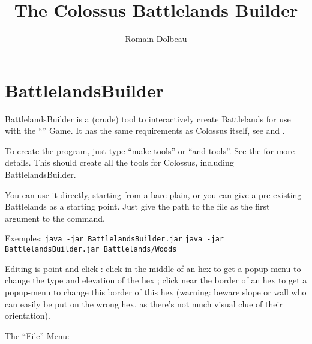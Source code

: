 \documentclass{article}
\begin{document}

\title{The Colossus Battlelands Builder}

\author{Romain Dolbeau}

\maketitle

\section{BattlelandsBuilder}

BattlelandsBuilder is a (crude) tool to interactively
create Battlelands for use with the
``'' Game.
It has the same requirements as Colossus itself, see
and
.

To create the program, just type ``make tools'' or ``and tools''.
See the
for more details.
This should create all the tools for Colossus, including
BattlelandsBuilder.

You can use it directly, starting from a bare plain,
or you can give a pre-existing Battlelands as a
starting point. Just give the path to the file as
the first argument to the command.

Exemples:
\texttt{java -jar BattlelandsBuilder.jar}
\texttt{java -jar BattlelandsBuilder.jar Battlelands/Woods}

Editing is point-and-click : click in the middle
of an hex to get a popup-menu to change the type
and elevation of the hex ; click near the border of
an hex to get a popup-menu to change this border of
this hex (warning: beware slope or wall who can
easily be put on the wrong hex, as there's not much
visual clue of their orientation).

The ``File'' Menu:
\end{document}
